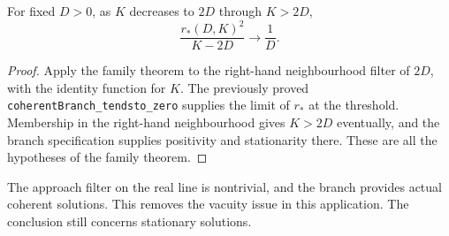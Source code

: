 \begin{claim}
For fixed $D>0$, as $K$ decreases to $2D$ through $K>2D$,
\[
 \frac{r_*(D,K)^2}{K-2D}\longrightarrow\frac1D.
\]
\end{claim}
\begin{proof}
Apply the family theorem to the right-hand neighbourhood filter of $2D$,
with the identity function for $K$. The previously proved
\texttt{coherentBranch\_tendsto\_zero} supplies the limit of $r_*$ at the
threshold. Membership in the right-hand neighbourhood gives $K>2D$
eventually, and the branch specification supplies positivity and stationarity
there. These are all the hypotheses of the family theorem.
\end{proof}
\scope The approach filter on the real line is nontrivial, and the branch
provides actual coherent solutions. This removes the vacuity issue in this
application. The conclusion still concerns stationary solutions.
